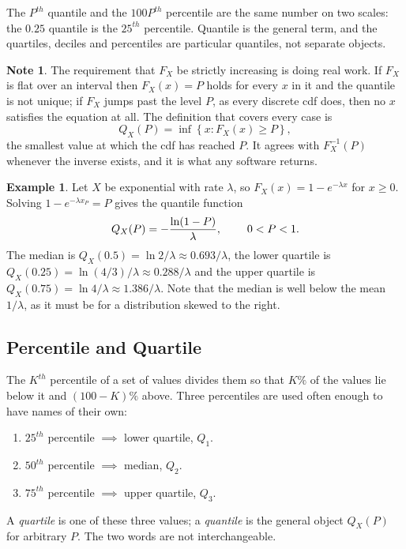 \documentclass[11pt,a4paper]{article}
\theoremstyle{definition}
\newtheorem{example}[thm]{Example}
\newtheorem{note}[thm]{Note}
\begin{document}
The $P^{th}$ quantile and the $100P^{th}$ percentile are the same number on two
scales: the $0.25$ quantile is the $25^{th}$ percentile. Quantile is the general
term, and the quartiles, deciles and percentiles are particular quantiles, not
separate objects.

\begin{note}
The requirement that $F_X$ be strictly increasing is doing real work. If $F_X$ is
flat over an interval then $F_X(x)=P$ holds for every $x$ in it and the quantile is
not unique; if $F_X$ jumps past the level $P$, as every discrete cdf does, then no
$x$ satisfies the equation at all. The definition that covers every case is
$$Q_X(P)=\inf\left\{x:F_X(x)\geq P\right\},$$
the smallest value at which the cdf has reached $P$. It agrees with $F_X^{-1}(P)$
whenever the inverse exists, and it is what any software returns.
\end{note}

\begin{example}
Let $X$ be exponential with rate $\lambda$, so $F_X(x)=1-e^{-\lambda x}$ for
$x\geq 0$. Solving $1-e^{-\lambda x_P}=P$ gives the quantile function
$$Q_X(P)=-\dfrac{\ln(1-P)}{\lambda},\hspace{0.8cm}0<P<1 .$$
The median is $Q_X(0.5)=\ln 2/\lambda\approx 0.693/\lambda$, the lower quartile is
$Q_X(0.25)=\ln(4/3)/\lambda\approx 0.288/\lambda$ and the upper quartile is
$Q_X(0.75)=\ln 4/\lambda\approx 1.386/\lambda$. Note that the median is well below
the mean $1/\lambda$, as it must be for a distribution skewed to the right.
\end{example}

\subsection{Percentile and Quartile}
The $K^{th}$ percentile of a set of values divides them so that $K\%$ of the
values lie below it and $(100-K)\%$ above. Three percentiles are used often enough
to have names of their own:
\begin{enumerate}
\item[*] $25^{th}$ percentile $\implies$ lower quartile, $Q_1$.
\item[*] $50^{th}$ percentile $\implies$ median, $Q_2$.
\item[*] $75^{th}$ percentile $\implies$ upper quartile, $Q_3$.
\end{enumerate}
A \emph{quartile} is one of these three values; a \emph{quantile} is the general
object $Q_X(P)$ for arbitrary $P$. The two words are not interchangeable.
\end{document}
